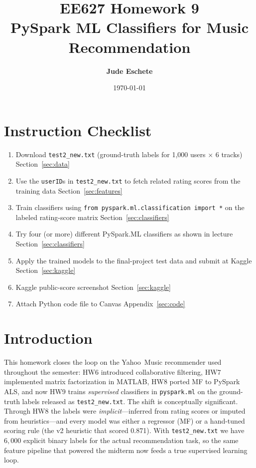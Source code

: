\documentclass[12pt]{article}
\title{\textbf{EE627 Homework 9\\ PySpark ML Classifiers for Music Recommendation}}
\author{\textbf{Jude Eschete}}
\date{\today}
\begin{document}
	\maketitle

	\newpage
	\section*{Instruction Checklist}

	\begin{enumerate}
		\item[\checkmark] Download \texttt{test2\_new.txt} (ground-truth labels for 1{,}000 users $\times$ 6 tracks) \dotfill Section~\ref{sec:data}
		\item[\checkmark] Use the \texttt{userID}s in \texttt{test2\_new.txt} to fetch related rating scores from the training data \dotfill Section~\ref{sec:features}
		\item[\checkmark] Train classifiers using \texttt{from pyspark.ml.classification import *} on the labeled rating-score matrix \dotfill Section~\ref{sec:classifiers}
		\item[\checkmark] Try four (or more) different PySpark.ML classifiers as shown in lecture \dotfill Section~\ref{sec:classifiers}
		\item[\checkmark] Apply the trained models to the final-project test data and submit at Kaggle \dotfill Section~\ref{sec:kaggle}
		\item[\checkmark] Kaggle public-score screenshot \dotfill Section~\ref{sec:kaggle}
		\item[\checkmark] Attach Python code file to Canvas \dotfill Appendix~\ref{sec:code}
	\end{enumerate}

	\newpage
	\section{Introduction}

	This homework closes the loop on the Yahoo~Music recommender used throughout the semester: HW6 introduced collaborative filtering, HW7 implemented matrix factorization in MATLAB, HW8 ported MF to PySpark ALS, and now HW9 trains \emph{supervised} classifiers in \texttt{pyspark.ml} on the ground-truth labels released as \texttt{test2\_new.txt}. The shift is conceptually significant. Through HW8 the labels were \emph{implicit}---inferred from rating scores or imputed from heuristics---and every model was either a regressor (MF) or a hand-tuned scoring rule (the v2 heuristic that scored 0.871). With \texttt{test2\_new.txt} we have $6{,}000$ explicit binary labels for the actual recommendation task, so the same feature pipeline that powered the midterm now feeds a true supervised learning loop.
\end{document}
